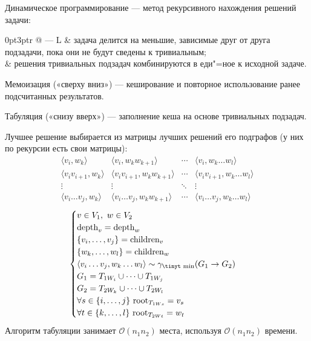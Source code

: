 {\ital Динамическое программирование} --- метод рекурсивного нахождения решений задачи:
\begin{tabularcx}{0pt}{3pt}{r @{ --- } L}{\textwidth}
& задача делится на меньшие, {\ital зависимые} друг от друга подзадачи, пока они не будут сведены к {\ital тривиальным};\\
& решения тривиальных подзадач {\ital комбинируются} в еди"=ное к исходной задаче.
\end{tabularcx}

{\ital Мемоизация} {\ital\color{desc} («сверху вниз»)} --- кеширование и повторное использование ранее подсчитанных результатов.

{\ital Табуляция} {\ital\color{desc} («снизу вверх»)} --- заполнение кеша на основе тривиальных подзадач.

Лучшее решение выбирается из матрицы лучших решений его подграфов {\ital\color{desc} (у них по рекурсии есть свои матрицы)}:
$$\begin{matrix}
\langle v_i,w_k\rangle & \langle v_i,w_kw_{k+1}\rangle & \cdots & \langle v_i,w_k\dots w_l\rangle\\
\langle v_iv_{i+1},w_k\rangle & \langle v_iv_{i+1},w_kw_{k+1}\rangle & \cdots & \langle v_iv_{i+1},w_k\dots w_l\rangle\\
\vdots & \vdots & \ddots & \vdots\\
\langle v_i\dots v_j,w_k\rangle & \langle v_i\dots v_j,w_kw_{k+1}\rangle & \cdots & \langle v_i\dots v_j,w_k\dots w_l\rangle
\end{matrix}$$
$$\begin{cases}
v\in V_1,\ w\in V_2\\
\text{depth}_v=\text{depth}_w\\
\{v_i,\dots,v_j\}=\text{children}_v\\
\{w_k,\dots,w_l\}=\text{children}_w\\
\langle v_i\dots v_j,w_k\dots w_l\rangle\sim\gamma_{\text{\tinyt min}}(G_1\to G_2)\\
G_1=T_{1W_i}\cup\dots\cup T_{1W_j}\\
G_2=T_{2W_k}\cup\dots\cup T_{2W_l}\\
\forall s\in\{i,\dots,j\}\ \text{root}_{T_{1Ws}}=v_s\\
\forall t\in\{k,\dots,l\}\ \text{root}_{T_{2Wt}}=w_t
\end{cases}$$
Алгоритм табуляции занимает $\mathcal{O}(n_1n_2)$ места, используя $\mathcal{O}(n_1n_2)$ времени.

